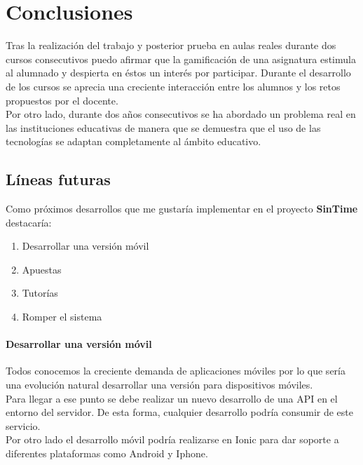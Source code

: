 \setcounter{chapter}{9}
\setcounter{section}{0}
\setcounter{subsection}{0}
\chapter{Conclusiones}

Tras la realización del trabajo y posterior prueba en aulas reales durante dos cursos consecutivos puedo afirmar que la gamificación de una asignatura estimula al alumnado y despierta en éstos un interés por participar. Durante el desarrollo de los cursos se aprecia una creciente interacción entre los alumnos y los retos propuestos por el docente.\\

Por otro lado, durante dos años consecutivos se ha abordado un problema real en las instituciones educativas de manera que se demuestra que el uso de las tecnologías se adaptan completamente al ámbito educativo.

\section{Líneas futuras}

Como próximos desarrollos que me gustaría implementar en el proyecto \textbf{SinTime} destacaría:

\begin{enumerate}
	\item Desarrollar una versión móvil
	\item Apuestas
	\item Tutorías
	\item Romper el sistema
\end{enumerate}

\subsubsection{Desarrollar una versión móvil}

Todos conocemos la creciente demanda de aplicaciones móviles por lo que sería una evolución natural desarrollar una versión para dispositivos móviles.\\

Para llegar a ese punto se debe realizar un nuevo desarrollo de una API en el entorno del servidor. De esta forma, cualquier desarrollo podría consumir de este servicio.\\

Por otro lado el desarrollo móvil podría realizarse en Ionic para dar soporte a diferentes plataformas como Android y Iphone.

